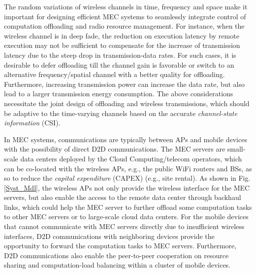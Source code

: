 \documentclass[journal]{IEEEtran}
\begin{document}
The random variations of wireless channels in time, frequency and space make it important for designing efficient MEC systems to seamlessly integrate control of computation offloading and radio resource management.   For instance, when the wireless channel is in deep fade, the reduction on execution latency  by remote execution may not be sufficient to  compensate for the increase of  transmission latency  due to the steep drop in transmission-data  rates. For such cases,  it is desirable to defer offloading till the channel gain is favorable or switch to an alternative frequency/spatial channel  with a better quality for offloading.  Furthermore, increasing  transmission power can increase the data rate, but also lead to a larger transmission energy consumption. The above considerations necessitate the joint design of offloading and wireless transmissions, which should be adaptive to the time-varying channels based on the accurate \emph{channel-state information} (CSI).



In  MEC systems, communications are typically  between APs and mobile devices with the possibility of direct D2D communications.  The  MEC servers are small-scale data centers deployed by the Cloud Computing/telecom operators, which can be co-located with the wireless APs, e.g., the public WiFi routers and BSs, as so to reduce the \emph{capital expenditure} (CAPEX) (e.g., site rental). As shown in Fig. \ref{Syst_Mdl}, the wireless APs not only provide the wireless interface for the MEC servers, but also enable the access to the remote data center through backhaul links, which could help the MEC server to further offload some computation tasks to other MEC servers or to  large-scale cloud data centers. For the mobile devices that cannot communicate with MEC servers directly due to insufficient wireless interfaces, D2D communications with neighboring devices provide the opportunity to forward the computation tasks to MEC servers.
 Furthermore, D2D communications also enable the peer-to-peer cooperation on resource sharing and computation-load balancing within a cluster of mobile devices.
\end{document}
